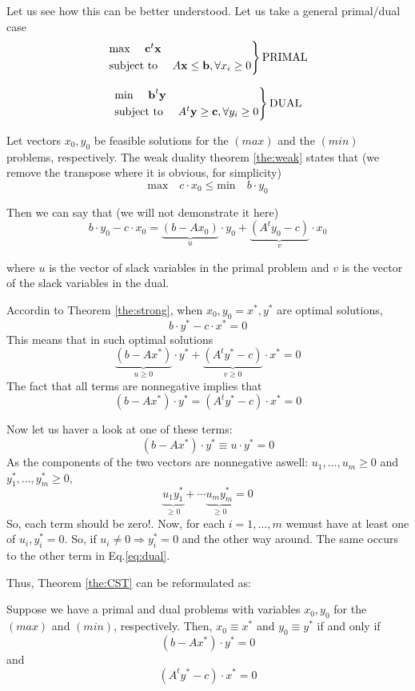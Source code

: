   Let us see how this can be better understood. Let us take a general primal/dual case
  \[
\begin{rcases}
\text{max }\quad\textbf{c}^t \textbf{x}\\
\text{subject to }\quad A\textbf{x}\leq \textbf{b}, \forall x_i\geq0
\end{rcases} \text{PRIMAL}
\]

\[
\begin{rcases}
\text{min }\quad\textbf{b}^t \textbf{y}\\
\text{subject to }\quad A^t\textbf{y}\geq \textbf{c}, \forall y_i\geq0
\end{rcases} \text{DUAL}
\]


  Let vectors $x_0,y_0$ be feasible solutions for the $(max)$ and the $(min)$ problems, respectively. The weak duality theorem \ref{the:weak} states that (we remove the transpose where it is obvious, for simplicity)
  \[\text{max} \quad c\cdot x_0 \leq \text{min}\quad b\cdot y_0\]

  Then we can say that (we will not demonstrate it here)
  \[b\cdot y_0 - c\cdot x_0 = \underbrace{(b-Ax_0)}_u\cdot y_0+\underbrace{(A^ty_0-c)}_v\cdot x_0\]
  
  where $u$ is the vector of slack variables in the primal problem and $v$ is the vector of the slack variables in the dual.


  Accordin to Theorem \ref{the:strong}, when $x_0,y_0=x^*,y^*$ are optimal solutions, \[b\cdot y^* - c\cdot x^* =0\]
  This means that in such optimal solutions
  \[\underbrace{(b-Ax^*)}_{u\geq 0}\cdot y^*+\underbrace{(A^ty^*-c)}_{v\geq 0}\cdot x^*=0\]
  The fact that all terms are nonnegative implies that 
  \begin{equation}(b-Ax^*)\cdot y^*=(A^ty^*-c)\cdot x^*=0\label{eq:dual}\end{equation}

  Now let us haver a look at one of these terms:
  \[(b-Ax^*)\cdot y^*\equiv u\cdot y^*=0\]
  As the components of the two vectors are nonnegative aswell: $u_1,\ldots,u_m\geq0$ and $y^*_1,\ldots,y^*_m\geq0$, 
  \[\underbrace{u_1 y_1^*}_{\geq0}+\cdots \underbrace{u_m y_m^*}_{\geq0}=0\]
  So, each term should be zero!. Now, for each $i=1,\ldots,m$ wemust have at least one of $u_i,y_i^*=0$. So, if $u_i\neq 0 \Rightarrow y_i^*=0$ and the other way around. The same occurs to the other term in Eq.\ref{eq:dual}.
  

  Thus, Theorem \ref{the:CST} can be reformulated as:
  \begin{theorem}
    Suppose we have a primal and dual problems with variables $x_0,y_0$ for the $(max)$ and $(min)$, respectively. Then, $x_0\equiv x^*$ and $y_0\equiv y^*$ if and only if 
    \begin{equation}(b-Ax^*)\cdot y^*=0\label{eq:CST1}\end{equation}
    and 
    \begin{equation}(A^ty^*-c)\cdot x^*=0\label{eq:CST2}\end{equation}
    \label{the:CST2}
  \end{theorem}



